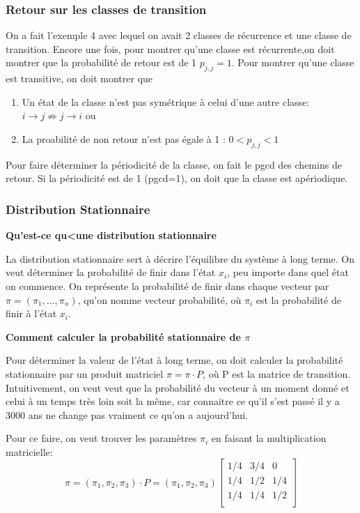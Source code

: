 \documentclass{article}
\begin{document}
\subsubsection{Retour sur les classes de transition}

On a fait l'exemple 4 avec lequel on avait 2 classes de récurrence et une
classe de transition. Encore une fois, pour montrer qu'une classe est
récurrente,on doit montrer que  la probabilité de retour est de 1 $p_{j,j} = 1$.
Pour montrer qu'une classe est transitive, on doit montrer que
\begin{enumerate}
    \item Un état de la classe n'est pas symétrique à celui d'une autre classe:
	$ i \to j \not\Longrightarrow j \to i$ ou
    \item La proabilité de non retour n'est pas égale à 1 : $0<p_{j,j} <1$
\end{enumerate}

Pour faire déterminer la périodicité de la classe, on fait le pgcd des chemins
de retour. Si la périodicité est de 1 (pgcd=1), on doit que la classe est
apériodique.

\subsubsection{Distribution Stationnaire}

\textbf{Qu'est-ce qu<une distribution stationnaire}

La distribution stationnaire sert à décrire l'équilibre du système à long
terme. On veut déterminer la probabilité de finir dans l'état $x_i$, peu
importe dans quel état on commence. On représente la probabilité de finir
dans chaque vecteur par $\pi=(\pi _1, ..., \pi _n)$, qu'on nomme vecteur
probabilité, où $\pi _i$ est la probabilité de finir à l'état $x_i$.

\textbf{Comment calculer la probabilité stationnaire de $\pi$}

Pour déterminer la valeur de l'état à long terme, on doit calculer la
probabilité stationnaire par un produit matriciel $\pi= \pi \cdot P$, où P
est la matrice de transition. Intuitivement, on veut veut que la probabilité
du vecteur à un moment donné et celui à un temps très loin soit la même, car
connaitre ce qu'il s'est passé il y a 3000 ans ne change pas vraiment ce qu'on
a aujourd'hui.

Pour ce faire, on veut trouver les paramètres $\pi _i$ en faisant la
multiplication matricielle:
$$  \pi = (\pi _1, \pi _2, \pi _3) \cdot P = (\pi _1, \pi _2, \pi _3)
\begin{bmatrix}
    1/4 & 3/4 & 0\\
    1/4 & 1/2 & 1/4\\
    1/4 & 1/4 & 1/2\\
\end{bmatrix} $$
\end{document}
